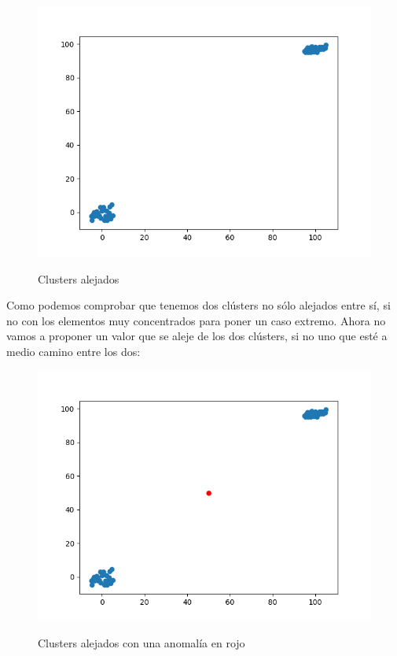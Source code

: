 \begin{figure}[H]
	\centering
	\includegraphics[scale=0.5]{imagenes/clusters}
	\label{clusters}
	\caption{Clusters alejados}
\end{figure}

Como podemos comprobar que tenemos dos clústers no sólo alejados entre sí, si no con los elementos muy concentrados para poner un caso extremo. Ahora no vamos a proponer un valor que se aleje de los dos clústers, si no uno que esté a medio camino entre los dos:

\begin{figure}[H]
	\centering
	\includegraphics[scale=0.5]{imagenes/outlier_cluster}
	\label{outlier_clusters}
	\caption{Clusters alejados con una anomalía en rojo}
\end{figure}

